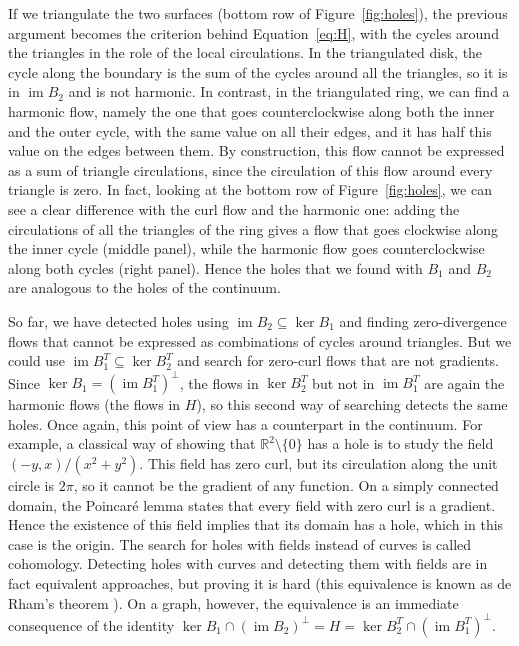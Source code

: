 \documentclass[11pt,a4paper]{article}
\theoremstyle{plain}
\theoremstyle{definition}
\newcommand{\R}{\mathbb{R}}
\newcommand{\im}{\operatorname{im}}
\begin{document}
If we triangulate the two surfaces (bottom row of Figure~\ref{fig:holes}), the previous argument becomes the criterion behind Equation~\eqref{eq:H}, with the cycles around the triangles in the role of the local circulations. In the triangulated disk, the cycle along the boundary is the sum of the cycles around all the triangles, so it is in $\operatorname{im}B_2$ and is not harmonic. In contrast, in the triangulated ring, we can find a harmonic flow, namely the one that goes counterclockwise along both the inner and the outer cycle, with the same value on all their edges, and it has half this value on the edges between them. By construction, this flow cannot be expressed as a sum of triangle circulations, since the circulation of this flow around every triangle is zero. In fact, looking at the bottom row of Figure~\ref{fig:holes}, we can see a clear difference with the curl flow and the harmonic one: adding the circulations of all the triangles of the ring gives a flow that goes clockwise along the inner cycle (middle panel), while the harmonic flow goes counterclockwise along both cycles (right panel). Hence the holes that we found with $B_1$ and $B_2$ are analogous to the holes of the continuum.

So far, we have detected holes using $\operatorname{im}B_2\subseteq\ker B_1$ and finding zero-divergence flows that cannot be expressed as combinations of cycles around triangles. But we could use $\operatorname{im}B_1^T\subseteq\ker B_2^T$ and search for zero-curl flows that are not gradients. Since $\ker B_1=(\operatorname{im}B_1^T)^\perp$, the flows in $\ker B_2^T$ but not in $\im B_1^T$ are again the harmonic flows (the flows in $H$), so this second way of searching detects the same holes. Once again, this point of view has a counterpart in the continuum. For example, a classical way of showing that $\R^2\setminus\{0\}$ has a hole is to study the field $(-y,x)/(x^2+y^2)$. This field has zero curl, but its circulation along the unit circle is $2\pi$, so it cannot be the gradient of any function. On a simply connected domain, the Poincar\'e lemma states that every field with zero curl is a gradient. Hence the existence of this field implies that its domain has a hole, which in this case is the origin. The search for holes with fields instead of curves is called cohomology. Detecting holes with curves and detecting them with fields are in fact equivalent approaches, but proving it is hard (this equivalence is known as de Rham's theorem \cite{derham1931}). On a graph, however, the equivalence is an immediate consequence of the identity $\ker B_1\cap(\operatorname{im}B_2)^\perp=H=\ker B_2^T\cap(\operatorname{im}B_1^T)^\perp
$.
\end{document}
